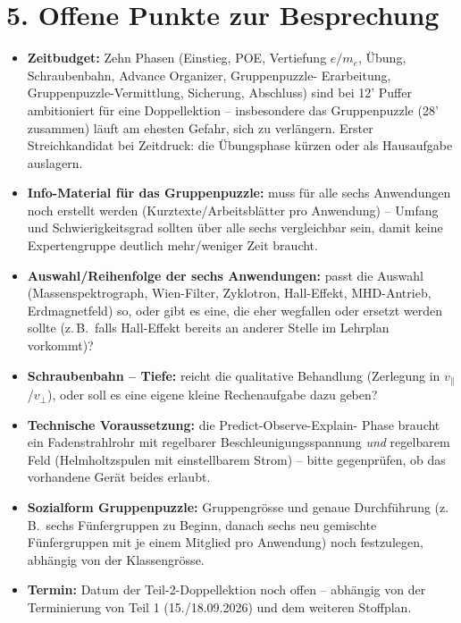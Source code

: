 \documentclass[11pt,a4paper]{article}
\begin{document}
\section*{5. Offene Punkte zur Besprechung}

\begin{itemize}[leftmargin=1.2cm,itemsep=0.4em]
  \item \textbf{Zeitbudget:} Zehn Phasen (Einstieg, POE, Vertiefung
  $e/m_e$, Übung, Schraubenbahn, Advance Organizer, Gruppenpuzzle-
  Erarbeitung, Gruppenpuzzle-Vermittlung, Sicherung, Abschluss) sind bei
  12' Puffer ambitioniert für eine Doppellektion -- insbesondere das
  Gruppenpuzzle (28' zusammen) läuft am ehesten Gefahr, sich zu
  verlängern. Erster Streichkandidat bei Zeitdruck: die Übungsphase
  kürzen oder als Hausaufgabe auslagern.
  \item \textbf{Info-Material für das Gruppenpuzzle:} muss für alle
  sechs Anwendungen noch erstellt werden (Kurztexte/Arbeitsblätter pro
  Anwendung) -- Umfang und Schwierigkeitsgrad sollten über alle sechs
  vergleichbar sein, damit keine Expertengruppe deutlich mehr/weniger
  Zeit braucht.
  \item \textbf{Auswahl/Reihenfolge der sechs Anwendungen:} passt die
  Auswahl (Massenspektrograph, Wien-Filter, Zyklotron, Hall-Effekt,
  MHD-Antrieb, Erdmagnetfeld) so, oder gibt es eine, die eher wegfallen
  oder ersetzt werden sollte (z.\,B.\ falls Hall-Effekt bereits an
  anderer Stelle im Lehrplan vorkommt)?
  \item \textbf{Schraubenbahn -- Tiefe:} reicht die qualitative
  Behandlung (Zerlegung in $v_\parallel$/$v_\perp$), oder soll es eine
  eigene kleine Rechenaufgabe dazu geben?
  \item \textbf{Technische Voraussetzung:} die Predict-Observe-Explain-
  Phase braucht ein Fadenstrahlrohr mit regelbarer
  Beschleunigungsspannung \emph{und} regelbarem Feld (Helmholtzspulen mit
  einstellbarem Strom) -- bitte gegenprüfen, ob das vorhandene Gerät
  beides erlaubt.
  \item \textbf{Sozialform Gruppenpuzzle:} Gruppengrösse und genaue
  Durchführung (z.\,B.\ sechs Fünfergruppen zu Beginn, danach sechs neu
  gemischte Fünfergruppen mit je einem Mitglied pro Anwendung) noch
  festzulegen, abhängig von der Klassengrösse.
  \item \textbf{Termin:} Datum der Teil-2-Doppellektion noch offen --
  abhängig von der Terminierung von Teil 1 (15./18.09.2026) und dem
  weiteren Stoffplan.
\end{itemize}
\end{document}
